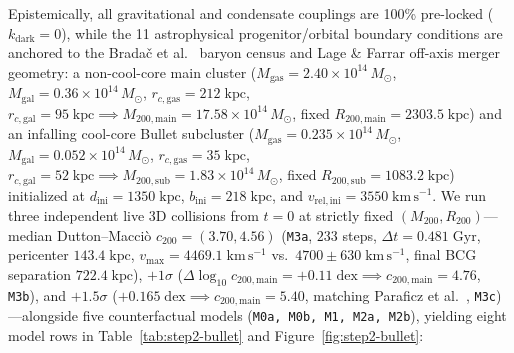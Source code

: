 \documentclass[11pt,a4paper]{article}
\begin{document}
Epistemically, all gravitational and condensate couplings are 100\% pre-locked ($k_{\mathrm{dark}} = 0$), while the 11 astrophysical progenitor/orbital boundary conditions are anchored to the Brada\v{c} et al.\ \cite{Bradac2006} baryon census and Lage \& Farrar \cite{LageFarrar2014} off-axis merger geometry: a non-cool-core main cluster ($M_{\mathrm{gas}} = 2.40\times 10^{14}\,M_\odot$, $M_{\mathrm{gal}} = 0.36\times 10^{14}\,M_\odot$, $r_{c,\mathrm{gas}} = 212\;\mathrm{kpc}$, $r_{c,\mathrm{gal}} = 95\;\mathrm{kpc} \implies M_{200,\mathrm{main}} = 17.58\times 10^{14}\,M_\odot$, fixed $R_{200,\mathrm{main}} = 2303.5\;\mathrm{kpc}$) and an infalling cool-core Bullet subcluster ($M_{\mathrm{gas}} = 0.235\times 10^{14}\,M_\odot$, $M_{\mathrm{gal}} = 0.052\times 10^{14}\,M_\odot$, $r_{c,\mathrm{gas}} = 35\;\mathrm{kpc}$, $r_{c,\mathrm{gal}} = 52\;\mathrm{kpc} \implies M_{200,\mathrm{sub}} = 1.83\times 10^{14}\,M_\odot$, fixed $R_{200,\mathrm{sub}} = 1083.2\;\mathrm{kpc}$) initialized at $d_{\mathrm{ini}} = 1350\;\mathrm{kpc}$, $b_{\mathrm{ini}} = 218\;\mathrm{kpc}$, and $v_{\mathrm{rel,ini}} = 3550\;\mathrm{km\,s^{-1}}$. We run three independent live 3D collisions from $t = 0$ at strictly fixed $(M_{200}, R_{200})$---median Dutton--Macci\`o \cite{DuttonMaccio2014} $c_{200} = (3.70, 4.56)$ (\texttt{M3a}, $233$ steps, $\Delta t = 0.481\;\mathrm{Gyr}$, pericenter $143.4\;\mathrm{kpc}$, $v_{\max} = 4469.1\;\mathrm{km\,s^{-1}}$ vs.\ $4700 \pm 630\;\mathrm{km\,s^{-1}}$, final BCG separation $722.4\;\mathrm{kpc}$), $+1\sigma$ ($\Delta\log_{10}c_{200,\mathrm{main}} = +0.11\;\mathrm{dex} \implies c_{200,\mathrm{main}} = 4.76$, \texttt{M3b}), and $+1.5\sigma$ ($+0.165\;\mathrm{dex} \implies c_{200,\mathrm{main}} = 5.40$, matching Paraficz et al.\ \cite{Paraficz2016}, \texttt{M3c})---alongside five counterfactual models (\texttt{M0a, M0b, M1, M2a, M2b}), yielding eight model rows in Table~\ref{tab:step2-bullet} and Figure~\ref{fig:step2-bullet}:
\end{document}
